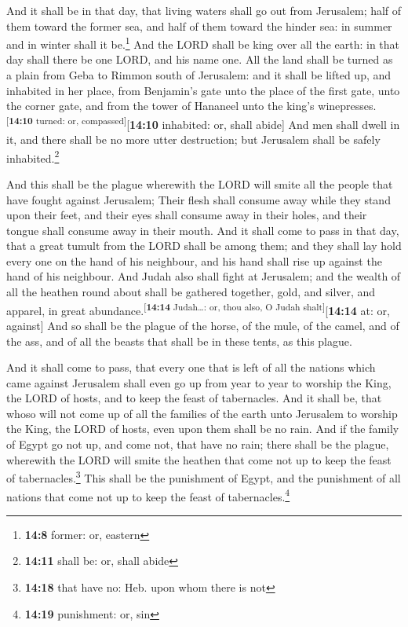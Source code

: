  And it shall be in that day, that living waters shall go
out from Jerusalem; half of them toward the former sea, and half of them
toward the hinder sea: in summer and in winter shall it be.\footnote{\textbf{14:8}
  former: or, eastern}  And the LORD shall be king over
all the earth: in that day shall there be one LORD, and his name one.
 All the land shall be turned as a plain from Geba to
Rimmon south of Jerusalem: and it shall be lifted up, and inhabited in
her place, from Benjamin's gate unto the place of the first gate, unto
the corner gate, and from the tower of Hananeel unto the king's
winepresses.\textsuperscript{{[}\textbf{14:10} turned: or,
compassed{]}}{[}\textbf{14:10} inhabited: or, shall abide{]}
 And men shall dwell in it, and there shall be no more
utter destruction; but Jerusalem shall be safely inhabited.\footnote{\textbf{14:11}
  shall be: or, shall abide}

 And this shall be the plague wherewith the LORD will
smite all the people that have fought against Jerusalem; Their flesh
shall consume away while they stand upon their feet, and their eyes
shall consume away in their holes, and their tongue shall consume away
in their mouth.  And it shall come to pass in that day,
that a great tumult from the LORD shall be among them; and they shall
lay hold every one on the hand of his neighbour, and his hand shall rise
up against the hand of his neighbour.  And Judah also
shall fight at Jerusalem; and the wealth of all the heathen round about
shall be gathered together, gold, and silver, and apparel, in great
abundance.\textsuperscript{{[}\textbf{14:14} Judah\ldots: or, thou also,
O Judah shalt{]}}{[}\textbf{14:14} at: or, against{]} 
And so shall be the plague of the horse, of the mule, of the camel, and
of the ass, and of all the beasts that shall be in these tents, as this
plague.

 And it shall come to pass, that every one that is left
of all the nations which came against Jerusalem shall even go up from
year to year to worship the King, the LORD of hosts, and to keep the
feast of tabernacles.  And it shall be, that whoso will
not come up of all the families of the earth unto Jerusalem to worship
the King, the LORD of hosts, even upon them shall be no rain.
 And if the family of Egypt go not up, and come not, that
have no rain; there shall be the plague, wherewith the LORD will smite
the heathen that come not up to keep the feast of
tabernacles.\footnote{\textbf{14:18} that have no: Heb. upon whom there
  is not}  This shall be the punishment of Egypt, and the
punishment of all nations that come not up to keep the feast of
tabernacles.\footnote{\textbf{14:19} punishment: or, sin}

